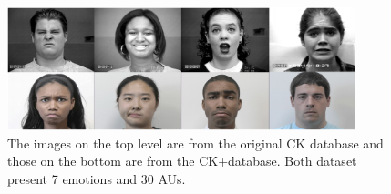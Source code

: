 \begin{figure}[!htb]	\includegraphics[width=0.9\textwidth]{images/CK+.png} 
    \centering

\caption{
The images on the top level are from the original CK database and those on the bottom are from the CK+database. Both dataset present 7 emotions and 30 AUs.
} 

\label{fig:ck}
\end{figure}